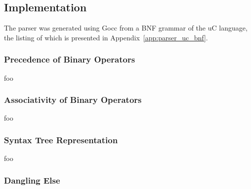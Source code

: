 \subsection{Implementation}

The parser was generated using Gocc from a BNF grammar of the uC language, the listing of which is presented in Appendix~\ref{app:parser_uc_bnf}.


\subsubsection{Precedence of Binary Operators}

foo

\subsubsection{Associativity of Binary Operators}

foo

\subsubsection{Syntax Tree Representation}


foo

\subsubsection{Dangling Else}

%
%
%
%
%

